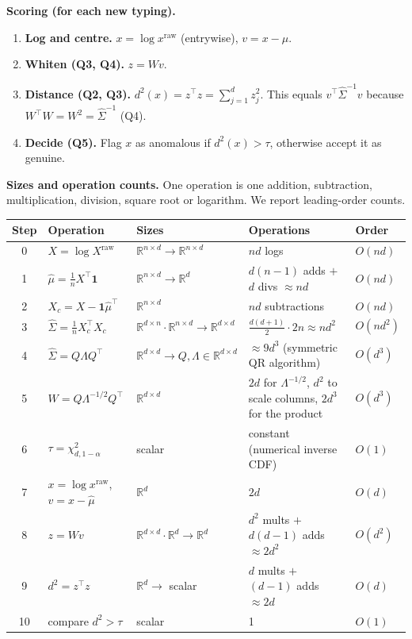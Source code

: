 \documentclass[11pt]{article}
\theoremstyle{definition}
\newcommand{\R}{\mathbb{R}}
\newcommand{\T}{^{\top}}
\begin{document}
\noindent\textbf{Scoring (for each new typing).}
\begin{enumerate}[label=(\arabic*), start=7, leftmargin=*]
\item \textbf{Log and centre.} $x=\log x^{\text{raw}}$ (entrywise), $v=x-\hat\mu$.
\item \textbf{Whiten (Q3, Q4).} $z=Wv$.
\item \textbf{Distance (Q2, Q3).} $d^2(x)=z\T z=\sum_{j=1}^d z_j^2$. This equals $v\T\hat\Sigma^{-1}v$ because $W\T W=W^2=\hat\Sigma^{-1}$ (Q4).
\item \textbf{Decide (Q5).} Flag $x$ as anomalous if $d^2(x)>\tau$, otherwise accept it as genuine.
\end{enumerate}

\noindent\textbf{Sizes and operation counts.} One operation is one addition, subtraction, multiplication, division, square root or logarithm. We report leading-order counts.

\begin{center}
\small
\begin{tabular}{@{}clp{3.2cm}p{4.6cm}l@{}}
\toprule
Step & Operation & Sizes & Operations & Order \\
\midrule
0 & $X=\log X^{\text{raw}}$ & $\R^{n\times d}\to\R^{n\times d}$ & $nd$ logs & $O(nd)$ \\
1 & $\hat\mu=\frac1n X\T\mathbf 1$ & $\R^{n\times d}\to\R^d$ & $d(n-1)$ adds $+$ $d$ divs $\approx nd$ & $O(nd)$ \\
2 & $X_c=X-\mathbf 1\hat\mu\T$ & $\R^{n\times d}$ & $nd$ subtractions & $O(nd)$ \\
3 & $\hat\Sigma=\frac1n X_c\T X_c$ & $\R^{d\times n}\cdot\R^{n\times d}\to\R^{d\times d}$ & $\frac{d(d+1)}{2}\cdot2n\approx nd^2$ & $O(nd^2)$ \\
4 & $\hat\Sigma=Q\Lambda Q\T$ & $\R^{d\times d}\to Q,\Lambda\in\R^{d\times d}$ & $\approx9d^3$ (symmetric QR algorithm) & $O(d^3)$ \\
5 & $W=Q\Lambda^{-1/2}Q\T$ & $\R^{d\times d}$ & $2d$ for $\Lambda^{-1/2}$, $d^2$ to scale columns, $2d^3$ for the product & $O(d^3)$ \\
6 & $\tau=\chi^2_{d,1-\alpha}$ & scalar & constant (numerical inverse CDF) & $O(1)$ \\
7 & $x=\log x^{\text{raw}}$, $v=x-\hat\mu$ & $\R^d$ & $2d$ & $O(d)$ \\
8 & $z=Wv$ & $\R^{d\times d}\cdot\R^d\to\R^d$ & $d^2$ mults $+$ $d(d-1)$ adds $\approx2d^2$ & $O(d^2)$ \\
9 & $d^2=z\T z$ & $\R^d\to$ scalar & $d$ mults $+$ $(d-1)$ adds $\approx2d$ & $O(d)$ \\
10 & compare $d^2>\tau$ & scalar & 1 & $O(1)$ \\
\bottomrule
\end{tabular}
\end{center}
\end{document}
